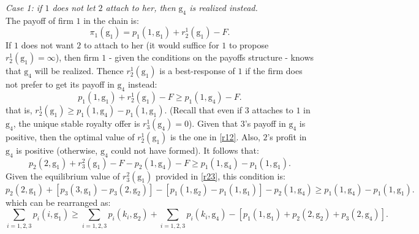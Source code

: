 \documentclass{article}
\begin{document}
\textit{Case 1: if $1$ does not let $2$ attach to her, then $\text{g}_{4}$ is realized instead.}\\

The payoff of firm $1$ in the chain is: 
\begin{equation*}
    \pi_1(\text{g}_1)=p_1(1,\text{g}_1)+r^1_2(\text{g}_1) -F.
\end{equation*}
If $1$ does not want $2$ to attach to her (it would suffice for $1$ to propose $r^1_2(\text{g}_1)=\infty$), then firm $1$ - given the conditions on the payoffs structure - knows that $\text{g}_4$ will be
realized. Thence $r^1_2(\text{g}_1)$ is a best-response of $1$ if the firm does not prefer to get its payoff in $\text{g}_4$ instead:\\
\begin{equation*}
    p_1(1,\text{g}_1)+r^1_2(\text{g}_1)-F\geq p_1(1,\text{g}_4)-F.
\end{equation*}
that is, $r^1_2(\text{g}_1)\geq p_1(1,\text{g}_4)-p_1(1,\text{g}_1)$. 
(Recall that even if $3$ attaches to $1$ in $\text{g}_4$, the unique stable royalty offer is $r^1_3(\text{g}_4)=0$). Given that $3$'s payoff in $\text{g}_4$ is positive, then the optimal value of $r^1_2(\text{g}_1)$ is the one in \eqref{r12}. Also, $2$'s profit in $\text{g}_4$ is positive (otherwise, $\text{g}_4$ could not have formed). It follows that:
\begin{equation*}
    p_2(2,\text{g}_1)+r^2_3(\text{g}_1)-F -p_2(1,\text{g}_4)-F \geq p_1(1,\text{g}_4)-p_1(1,\text{g}_1).
\end{equation*}
Given the equilibrium value of $r^2_3(\text{g}_1)$ provided in \eqref{r23}, this condition is: 
\begin{equation*}
    p_2(2,\text{g}_1)+[p_3(3,\text{g}_1)-p_3(2,\text{g}_2)]-[p_1(1,\text{g}_2)-p_1(1,\text{g}_1)]-p_2(1,\text{g}_4)\geq p_1(1,\text{g}_4)-p_1(1,\text{g}_1). 
\end{equation*}
which can be rearranged as: 
\begin{equation}
    \sum_{i=1,2,3} p_i(i,\text{g}_1)\geq \sum_{i=1,2,3}p_i(k_i,\text{g}_2)+\sum_{i=1,2,3}p_i(k_i,\text{g}_4)-[p_1(1,\text{g}_1)+p_2(2,\text{g}_2)+p_3(2,\text{g}_4)].
\end{equation}
\end{document}
